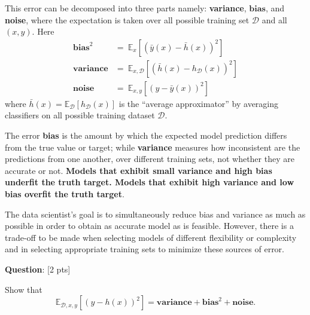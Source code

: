 \documentclass[10pt]{article}
\begin{document}
This error can be decomposed into three parts namely: \textbf{variance}, $\textbf{bias}$, and \textbf{noise}, where the expectation is taken over all possible training set $\mathcal{D}$ and all $(x,y)$. Here
\begin{equation}
\begin{aligned} 
\textbf{bias}^2 &=\ \mathbb{E}_{x}[(\bar{y}(x)-\bar{h}(x))^2]\\
\textbf{variance} &=\ \mathbb{E}_{x,\mathcal{D}} [(\bar{h}(x)-h_{\mathcal{D}}(x))^2]\\
\textbf{noise} &=\ \mathbb{E}_{x,y}[(y-\bar{y}(x))^2]
\end{aligned}
\end{equation}
where $\bar{h}(x)=\mathbb{E}_{\mathcal{D}}[h_{\mathcal{D}}(x)]$ is the ``average approximator'' by averaging classifiers on all possible training dataset $\mathcal{D}$.

 
The error \textbf{bias} is the amount by which the expected model prediction differs from the true value or target; while \textbf{variance} measures how inconsistent are the predictions from one another, over different training sets, not whether they are accurate or not. \textbf{Models that exhibit small variance and high bias underfit the truth target. Models that exhibit high variance and low bias overfit the truth target}.

The data scientist’s goal is to simultaneously reduce bias and variance as much as possible in order to obtain as accurate model as is feasible. However, there is a trade-off to be made when selecting models of different flexibility or complexity and in selecting appropriate training sets to minimize these sources of error.

\textbf{Question}:  {\color{red} [2 pts]}

Show that
\begin{equation}
    \mathbb{E}_{\mathcal{D},x,y}[(y-h(x))^2] = \textbf{variance}+\textbf{bias}^2+\textbf{noise}.
\end{equation}


\end{document}

